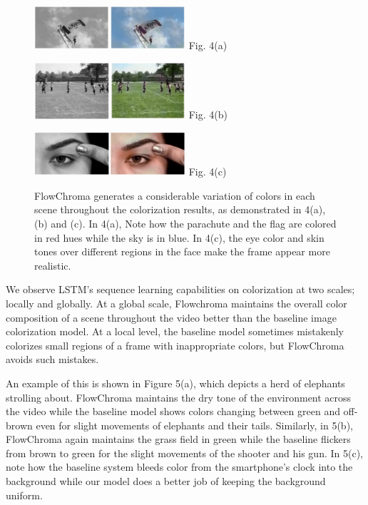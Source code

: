 \documentclass[10pt,twocolumn,letterpaper]{article}
\begin{document}
\begin{figure}[!h]
  \centering
  \includegraphics[width=0.5\textwidth]{bw-fc-parachute.jpg}
  \label{}{\footnotesize Fig. 4(a)}
\end{figure}

\begin{figure}[!h]
  \centering
  \includegraphics[width=0.5\textwidth]{bw-fc-fifa.jpg}
  \label{}{\footnotesize Fig. 4(b)}
\end{figure}

\begin{figure}[!h]
  \centering
  \includegraphics[width=0.5\textwidth]{bw-fc-lady-face.jpg}
  \label{}{\footnotesize Fig. 4(c)}
  \caption{FlowChroma generates a considerable variation of colors in each scene throughout the colorization results, as demonstrated in 4(a), (b) and (c). In 4(a), Note how the parachute and the flag are colored in red hues while the sky is in blue. In 4(c), the eye color and skin tones over different regions in the face make the frame appear more realistic.}
\end{figure}

We observe LSTM's sequence learning capabilities on colorization at two scales; locally and globally. At a global scale, Flowchroma maintains the overall color composition of a scene throughout the video better than the baseline image colorization model. At a local level, the baseline model sometimes mistakenly colorizes small regions of a frame with inappropriate colors, but FlowChroma avoids such mistakes.

An example of this is shown in Figure 5(a), which depicts a herd of elephants strolling about. FlowChroma maintains the dry tone of the environment across the video while the baseline model shows colors changing between green and off-brown even for slight movements of elephants and their tails. Similarly, in 5(b), FlowChroma again maintains the grass field in green while the baseline flickers from brown to green for the slight movements of the shooter and his gun. In 5(c), note how the baseline system bleeds color from the smartphone's clock into the background while our model does a better job of keeping the background uniform. 
\end{document}
